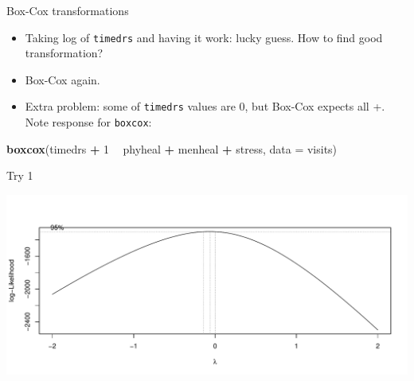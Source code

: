 \documentclass[
  ignorenonframetext,
]{beamer}
\newenvironment{Shaded}{\begin{snugshade}}{\end{snugshade}}
\newcommand{\DataTypeTok}[1]{\textcolor[rgb]{0.13,0.29,0.53}{#1}}
\newcommand{\DecValTok}[1]{\textcolor[rgb]{0.00,0.00,0.81}{#1}}
\newcommand{\KeywordTok}[1]{\textcolor[rgb]{0.13,0.29,0.53}{\textbf{#1}}}
\newcommand{\NormalTok}[1]{#1}
\newcommand{\OperatorTok}[1]{\textcolor[rgb]{0.81,0.36,0.00}{\textbf{#1}}}
\newcommand{\StringTok}[1]{\textcolor[rgb]{0.31,0.60,0.02}{#1}}
\begin{document}
\begin{frame}[fragile]{Box-Cox transformations}
\protect\hypertarget{box-cox-transformations}{}

\begin{itemize}
\item
  Taking log of \texttt{timedrs} and having it work: lucky guess. How to
  find good transformation?
\item
  Box-Cox again.
\item
  Extra problem: some of \texttt{timedrs} values are 0, but Box-Cox
  expects all +. Note response for \texttt{boxcox}:
\end{itemize}

\begin{Shaded}
\begin{Highlighting}[]
\KeywordTok{boxcox}\NormalTok{(timedrs }\OperatorTok{+}\StringTok{ }\DecValTok{1} \OperatorTok{~}\StringTok{ }\NormalTok{phyheal }\OperatorTok{+}\StringTok{ }\NormalTok{menheal }\OperatorTok{+}\StringTok{ }\NormalTok{stress, }\DataTypeTok{data =}\NormalTok{ visits)}
\end{Highlighting}
\end{Shaded}

\end{frame}

\begin{frame}{Try 1}
\protect\hypertarget{try-1}{}

\includegraphics{slides_d29_files/figure-beamer/unnamed-chunk-62-1.pdf}

\end{frame}
\end{document}
